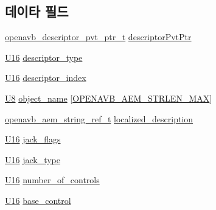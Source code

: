 \subsection*{데이타 필드}
\begin{DoxyCompactItemize}
\item 
\hyperlink{openavb__aem__pub_8h_a85eabab4b7d2466e94c1c3b43b11371d}{openavb\+\_\+descriptor\+\_\+pvt\+\_\+ptr\+\_\+t} \hyperlink{structopenavb__aem__descriptor__jack__io__t_a302e92fd6cf4d398d5305395359fb157}{descriptor\+Pvt\+Ptr}
\item 
\hyperlink{openavb__types__base__pub_8h_a0a0a322d5fa4a546d293a77ba8b4a71f}{U16} \hyperlink{structopenavb__aem__descriptor__jack__io__t_a1e231d7874aada5925b29affc76782cc}{descriptor\+\_\+type}
\item 
\hyperlink{openavb__types__base__pub_8h_a0a0a322d5fa4a546d293a77ba8b4a71f}{U16} \hyperlink{structopenavb__aem__descriptor__jack__io__t_ab26fb363c24b9a2a4391f9171c981b08}{descriptor\+\_\+index}
\item 
\hyperlink{openavb__types__base__pub_8h_aa63ef7b996d5487ce35a5a66601f3e73}{U8} \hyperlink{structopenavb__aem__descriptor__jack__io__t_a5e98aba8105a7a6d82fac41816c83da3}{object\+\_\+name} \mbox{[}\hyperlink{openavb__aem__types__pub_8h_ab2bb82e9f856a76b8305e4864f23ee58}{O\+P\+E\+N\+A\+V\+B\+\_\+\+A\+E\+M\+\_\+\+S\+T\+R\+L\+E\+N\+\_\+\+M\+AX}\mbox{]}
\item 
\hyperlink{structopenavb__aem__string__ref__t}{openavb\+\_\+aem\+\_\+string\+\_\+ref\+\_\+t} \hyperlink{structopenavb__aem__descriptor__jack__io__t_afd613361c59409fb6dcc0c237d1cfbfd}{localized\+\_\+description}
\item 
\hyperlink{openavb__types__base__pub_8h_a0a0a322d5fa4a546d293a77ba8b4a71f}{U16} \hyperlink{structopenavb__aem__descriptor__jack__io__t_aed741d70a68826371496e4355632dd15}{jack\+\_\+flags}
\item 
\hyperlink{openavb__types__base__pub_8h_a0a0a322d5fa4a546d293a77ba8b4a71f}{U16} \hyperlink{structopenavb__aem__descriptor__jack__io__t_ac594eefe149f7fc698cf74acc0c0a3bd}{jack\+\_\+type}
\item 
\hyperlink{openavb__types__base__pub_8h_a0a0a322d5fa4a546d293a77ba8b4a71f}{U16} \hyperlink{structopenavb__aem__descriptor__jack__io__t_ab8a96da60faf5e9dfdef4464fbfd5288}{number\+\_\+of\+\_\+controls}
\item 
\hyperlink{openavb__types__base__pub_8h_a0a0a322d5fa4a546d293a77ba8b4a71f}{U16} \hyperlink{structopenavb__aem__descriptor__jack__io__t_af2706407b5397c06e6f4c45474ba75d3}{base\+\_\+control}
\end{DoxyCompactItemize}



